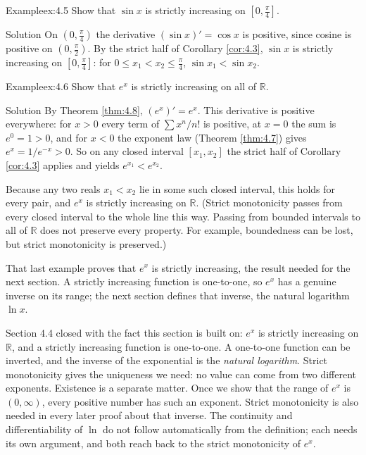 \documentclass[a4paper,12pt,oneside]{memoir}
\begin{document}
\begin{workedexample}
\begin{envexample}{Example}{ex:4.5}{}
Show that \(\sin x\) is strictly increasing on \([0, \tfrac{\pi}{4}]\).
\end{envexample}
\begin{envsolution}{Solution}{}{}
On \((0, \tfrac{\pi}{4})\) the derivative \((\sin x)' = \cos x\) is positive, since cosine is positive on \((0, \tfrac{\pi}{2})\). By the strict half of Corollary \ref{cor:4.3}, \(\sin x\) is strictly increasing on \([0, \tfrac{\pi}{4}]\): for \(0 \le x_{1} < x_{2} \le \tfrac{\pi}{4}\), \(\sin x_{1} < \sin x_{2}\). \qedmark
\end{envsolution}
\end{workedexample}
\begin{workedexample}
\begin{envexample}{Example}{ex:4.6}{}
Show that \(e^{x}\) is strictly increasing on all of \(\mathbb{R}\).
\end{envexample}
\begin{envsolution}{Solution}{}{}
By Theorem \ref{thm:4.8}, \((e^{x})' = e^{x}\). This derivative is positive everywhere: for \(x > 0\) every term of \(\sum x^{n}/n!\) is positive, at \(x = 0\) the sum is \(e^{0} = 1 > 0\), and for \(x < 0\) the exponent law (Theorem \ref{thm:4.7}) gives \(e^{x} = 1/e^{-x} > 0\). So on any closed interval \([x_{1}, x_{2}]\) the strict half of Corollary \ref{cor:4.3} applies and yields \(e^{x_{1}} < e^{x_{2}}\).

Because any two reals \(x_{1} < x_{2}\) lie in some such closed interval, this holds for every pair, and \(e^{x}\) is strictly increasing on \(\mathbb{R}\). (Strict monotonicity passes from every closed interval to the whole line this way. Passing from bounded intervals to all of \(\mathbb{R}\) does not preserve every property. For example, boundedness can be lost, but strict monotonicity is preserved.) \qedmark
\end{envsolution}
\end{workedexample}
That last example proves that \(e^{x}\) is strictly increasing, the result needed for the next section. A strictly increasing function is one-to-one, so \(e^{x}\) has a genuine inverse on its range; the next section defines that inverse, the natural logarithm \(\ln x\).


Section 4.4 closed with the fact this section is built on: \(e^{x}\) is strictly increasing on \(\mathbb{R}\), and a strictly increasing function is one-to-one. A one-to-one function can be inverted, and the inverse of the exponential is the \emph{natural logarithm}. Strict monotonicity gives the uniqueness we need: no value can come from two different exponents. Existence is a separate matter. Once we show that the range of \(e^{x}\) is \((0,\infty)\), every positive number has such an exponent. Strict monotonicity is also needed in every later proof about that inverse. The continuity and differentiability of \(\ln\) do not follow automatically from the definition; each needs its own argument, and both reach back to the strict monotonicity of \(e^{x}\).
\end{document}
